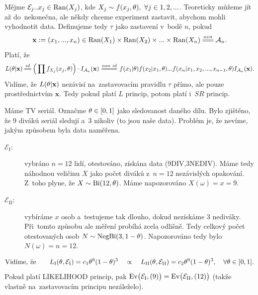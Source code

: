 \begin{example}
	Mějme $\mathcal{E}_j..x_j\in\mathop{\mathrm{Ran}}(X_j)$, kde $X_j\sim f(x_j,\theta),~\forall j\in 1,2,...$. Teoreticky můžeme jít až do~nekonečna, ale někdy chceme experiment zastavit, abychom mohli vyhodnotit data. Definujeme tedy $\tau$ jako zastavení v~bodě $n$, pokud $$\textbf{x}:=(x_1,...,x_n)\in\Ran(X_1)\times\Ran(X_2)\times...\times\Ran(X_n)\equal{ozn}\Aa_n.$$ Platí, že
	$$ L(\t|\textbf{x})\equal{id}\Big(\prod f_{X_j}(x_j,\t) \Big)\cdot I_{\Aa_n}(\textbf{x})\equal{non~id}f(x_1|\t)f(x_2|x_1,\t)...f(x_n|x_1,x_2,...,x_{n-1},\t)I_{\Aa_n}(\textbf{x}).$$
	Vidíme, že $L(\theta|\textbf{x})$ nezávisí na~zastavovacím pravidlu $\tau$ přímo, ale pouze prostřednictvím $\textbf{x}$. Tedy pokud platí $L$ princip, potom platí i~$SR$ princip.
\end{example}
\begin{example}
	Máme TV seriál. Označme $\theta\in[0,1]$ jako sledovanost daného dílu. Bylo zjištěno, že 9 diváků seriál sledují a~3 nikoliv (to jsou naše data). Problém je, že nevíme, jakým způsobem byla data naměřena. 
	\begin{description}
		\item[$\mathcal{E}_\mathrm{I}:$] vybráno $n=12$ lidí, otestováno, získána data (9DIV,3NEDIV). Máme tedy náhodnou veličinu $X$ jako počet diváků z~$n=12$ nezávislých opakování. Z~toho plyne, že $X\sim \mathrm{Bi}(12,\theta)$. Máme napozorováno $X(\omega)=x=9$.
		\item[$\mathcal{E}_\mathrm{II}:$] vybíráme $x$ osob a~testujeme tak dlouho, dokud nezískáme $3$ nediváky. Při~tomto způsobu ale měření probíhá zcela odlišně. Tedy celkový počet otestovaných osob \mbox{$N\sim\mathrm{NegBi}(3,1-\theta)$}. Napozorováno tedy bylo $N(\omega)=n=12$.
	\end{description}
	$$ \text{Vidíme, že}\qquad L_\mathrm{I}(\theta,\mathcal{E}_\mathrm{I})=c_1\theta^9(1-\theta)^3\quad\propto\quad L_\mathrm{II}(\theta,\mathcal{E}_\mathrm{II})=c_2\theta^9(1-\theta)^3,\quad \forall\theta\in[0,1]. $$
	Pokud platí LIKELIHOOD princip, pak $\mathrm{Ev}\big(\mathcal{E}_\mathrm{I},(9)\big)=\mathrm{Ev}\big(\mathcal{E}_\mathrm{II},(12)\big)$ (takže vlastně na~zastavovacím principu nezáleželo).
\end{example}

